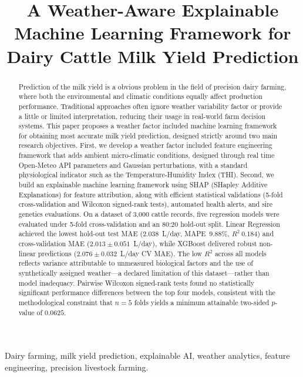 \documentclass[conference]{IEEEtran}
\begin{document}
	
	\title{A Weather-Aware Explainable Machine Learning Framework for Dairy Cattle Milk Yield Prediction}
	
	\maketitle	
	\setlength{\parskip}{0pt}
	\begin{abstract}
		Prediction of the milk yield is a obvious problem in the field of precision dairy farming, where both the environmental and climatic conditions equally affect production performance. Traditional approaches often ignore weather variability factor or provide a little or limited interpretation, reducing their usage in real-world farm decision systems. This paper proposes a weather factor included machine learning framework for obtaining most accurate milk yield prediction, designed strictly around two main research objectives. First, we develop a weather factor included feature engineering framework that adds ambient micro-climatic conditions, designed through real time Open-Meteo API parameters and Gaussian perturbations, with a standard physiological indicator such as the Temperature-Humidity Index (THI). Second, we build an explainable machine learning framework using SHAP (SHapley Additive Explanations) for feature attribution, along with efficient statistical validations (5-fold cross-validation and Wilcoxon signed-rank tests), automated health alerts, and sire genetics evaluations. On a dataset of 3,000 cattle records, five regression models were evaluated under 5-fold cross-validation and an 80:20 hold-out split. Linear Regression achieved the lowest hold-out test MAE ($2.038$~L/day, MAPE~$9.88\%$, $R^2~0.184$) and cross-validation MAE ($2.013 \pm 0.051$~L/day), while XGBoost delivered robust non-linear predictions ($2.076 \pm 0.032$~L/day CV MAE). The low $R^2$ across all models reflects variance attributable to unmeasured biological factors and the use of synthetically assigned weather—a declared limitation of this dataset—rather than model inadequacy. Pairwise Wilcoxon signed-rank tests found no statistically significant performance differences between the top four models, consistent with the methodological constraint that $n=5$ folds yields a minimum attainable two-sided $p$-value of $0.0625$.
	\end{abstract}
	
	\begin{IEEEkeywords}
		Dairy farming, milk yield prediction, explainable AI, weather analytics, feature engineering, precision livestock farming.
	\end{IEEEkeywords}
	
\end{document}
